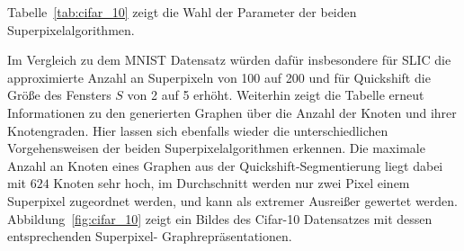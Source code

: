 Tabelle~\ref{tab:cifar_10} zeigt die Wahl der Parameter der beiden Superpixelalgorithmen.
\begin{table}[t]
\centering
{}
\caption[\gls{Cifar}-10 Superpixelparameter]{Wahl der Superpixelparameter des \gls{Cifar}-10 Datensatzes.}
\label{tab:cifar_10}
\end{table}
Im Vergleich zu dem \gls{MNIST} Datensatz würden dafür insbesondere für \gls{SLIC} die approximierte Anzahl an Superpixeln von 100 auf 200 und für Quickshift die Größe des Fensters $S$ von 2 auf 5 erhöht.
Weiterhin zeigt die Tabelle erneut Informationen zu den generierten Graphen über die Anzahl der Knoten und ihrer Knotengraden.
Hier lassen sich ebenfalls wieder die unterschiedlichen Vorgehensweisen der beiden Superpixelalgorithmen erkennen.
Die maximale Anzahl an Knoten eines Graphen aus der Quickshift-Segmentierung liegt dabei mit $624$ Knoten sehr hoch, \dhe{} im Durchschnitt werden nur zwei Pixel einem Superpixel zugeordnet werden, und kann als extremer Ausreißer gewertet werden.
Abbildung~\ref{fig:cifar_10} zeigt ein Bildes des \gls{Cifar}-10 Datensatzes mit dessen entsprechenden Superpixel- \bzw{} Graphrepräsentationen.


